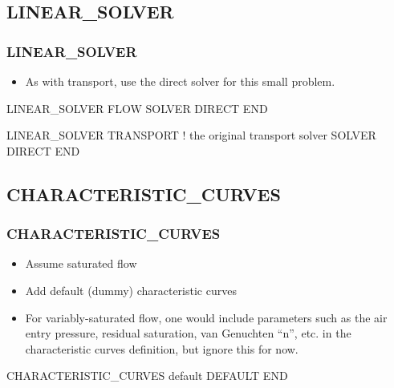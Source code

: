 \documentclass{beamer}
\newcommand\gehcomment[1]{{{\color{orange} #1}}}
\newcommand\bluecomment[1]{{{\color{blue} #1}}}
\newcommand\magentacomment[1]{{{\color{magenta} #1}}}
\begin{document}
\subsection{LINEAR\_SOLVER}

\begin{frame}[fragile]\frametitle{LINEAR\_SOLVER}

\begin{itemize}
\item As with transport, use the direct solver for this small problem.
\end{itemize}


\begin{semiverbatim}

\magentacomment{LINEAR_SOLVER FLOW}
  \magentacomment{SOLVER DIRECT}
\magentacomment{END}

LINEAR_SOLVER TRANSPORT  \bluecomment{! the original transport solver}
  SOLVER DIRECT
END
\end{semiverbatim}

\end{frame}

\subsection{CHARACTERISTIC\_CURVES}

\begin{frame}[fragile]\frametitle{CHARACTERISTIC\_CURVES}

\begin{itemize}
\item Assume saturated flow
\item Add default (dummy) characteristic curves
\item For variably-saturated flow, one would include parameters such as the air entry pressure, residual saturation, van Genuchten ``n'', etc. in the characteristic curves definition, \gehcomment{but ignore this for now}.
\end{itemize}

\begin{semiverbatim}

\magentacomment{CHARACTERISTIC_CURVES default
  DEFAULT
END}
\end{semiverbatim}

\end{frame}

\end{document}
